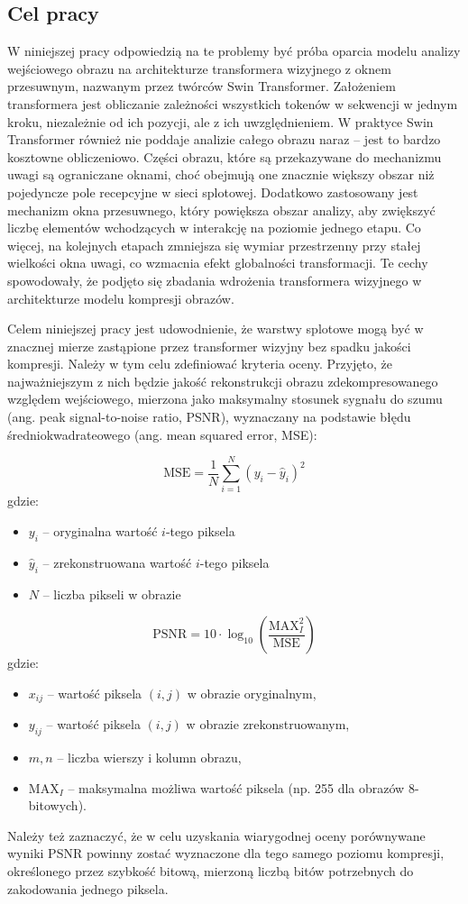 \subsection{Cel pracy}
W niniejszej pracy odpowiedzią na te problemy być próba oparcia modelu analizy wejściowego obrazu na architekturze transformera wizyjnego z oknem przesuwnym, nazwanym przez twórców Swin Transformer. Założeniem transformera jest obliczanie zależności wszystkich tokenów w sekwencji w jednym kroku, niezależnie od ich pozycji, ale z ich uwzględnieniem. W praktyce Swin Transformer również nie poddaje analizie całego obrazu naraz – jest to bardzo kosztowne obliczeniowo. Części obrazu, które są przekazywane do mechanizmu uwagi są ograniczane oknami, choć obejmują one znacznie większy obszar niż pojedyncze pole recepcyjne w sieci splotowej. Dodatkowo zastosowany jest mechanizm okna przesuwnego, który powiększa obszar analizy, aby zwiększyć liczbę elementów wchodzących w interakcję na poziomie jednego etapu. Co więcej, na kolejnych etapach zmniejsza się wymiar przestrzenny przy stałej wielkości okna uwagi, co wzmacnia efekt globalności transformacji. Te cechy spowodowały, że podjęto się zbadania wdrożenia transformera wizyjnego w architekturze modelu kompresji obrazów. 

Celem niniejszej pracy jest udowodnienie, że warstwy splotowe mogą być w znacznej mierze zastąpione przez transformer wizyjny bez spadku jakości kompresji. Należy w tym celu zdefiniować kryteria oceny. Przyjęto, że najważniejszym z nich będzie jakość rekonstrukcji obrazu zdekompresowanego względem wejściowego, mierzona jako maksymalny stosunek sygnału do szumu (ang. peak signal-to-noise ratio, PSNR), wyznaczany na podstawie błędu średniokwadrateowego (ang. mean squared error, MSE):

\begin{equation}
	\text{MSE} = \frac{1}{N} \sum_{i=1}^{N} (y_i - \hat{y}_i)^2
\end{equation}
gdzie:
\begin{itemize}
	\item $y_i$ -- oryginalna wartość $i$-tego piksela
	\item $\hat{y}_i$ -- zrekonstruowana wartość $i$-tego piksela
	\item $N$ -- liczba pikseli w obrazie
\end{itemize}

\begin{equation}
	\text{PSNR} = 10 \cdot \log_{10} \left( \frac{\text{MAX}_I^2}{\text{MSE}} \right)
\end{equation}
gdzie:
\begin{itemize}
	\item $x_{ij}$ -- wartość piksela $(i, j)$ w obrazie oryginalnym,
	\item $y_{ij}$ -- wartość piksela $(i, j)$ w obrazie zrekonstruowanym,
	\item $m, n$ -- liczba wierszy i kolumn obrazu,
	\item $\mathrm{MAX}_I$ -- maksymalna możliwa wartość piksela (np. 255 dla obrazów 8-bitowych).
\end{itemize}

Należy też zaznaczyć, że w celu uzyskania wiarygodnej oceny porównywane wyniki PSNR powinny zostać wyznaczone dla tego samego poziomu kompresji, określonego przez szybkość bitową, mierzoną liczbą bitów potrzebnych do zakodowania jednego piksela.

